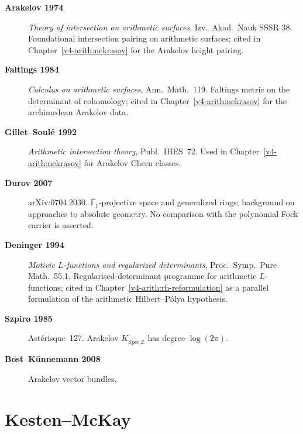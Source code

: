 \begin{description}
\item[\textbf{Arakelov 1974}] \emph{Theory of intersection on
arithmetic surfaces}, Izv.~Akad.~Nauk SSSR 38. Foundational
intersection pairing on arithmetic surfaces; cited in
Chapter~\ref{v4-arith:nekrasov} for the Arakelov height
pairing.
\item[\textbf{Faltings 1984}] \emph{Calculus on arithmetic
surfaces}, Ann.~Math.~119. Faltings metric on the determinant of
cohomology; cited in Chapter~\ref{v4-arith:nekrasov} for the
archimedean Arakelov data.
\item[\textbf{Gillet--Soul\'e 1992}] \emph{Arithmetic intersection
theory}, Publ.~IHES~72. Used in Chapter~\ref{v4-arith:nekrasov} for
Arakelov Chern classes.
\item[\textbf{Durov 2007}] arXiv:0704.2030. \(\mathbb{F}_{1}\)-projective
space and generalized rings; background on approaches to absolute
geometry. No comparison with the polynomial Fock carrier is asserted.
\item[\textbf{Deninger 1994}] \emph{Motivic \(L\)-functions and
regularized determinants}, Proc.~Symp.~Pure Math.~55.1.
Regularised-determinant programme for arithmetic \(L\)-functions;
cited in Chapter~\ref{v4-arith:rh-reformulation} as a parallel
formulation of the arithmetic Hilbert--P\'olya hypothesis.
\item[\textbf{Szpiro 1985}] Ast\'erisque~127. Arakelov
\(K_{\overline{\mathrm{Spec}\,\mathbb{Z}}}\) has degree \(\log(2\pi)\).
\item[\textbf{Bost--K\"unnemann 2008}] Arakelov
vector bundles.
\end{description}

\section{Kesten--McKay}
\label{v4-arith:app:A:kesten-mckay}

